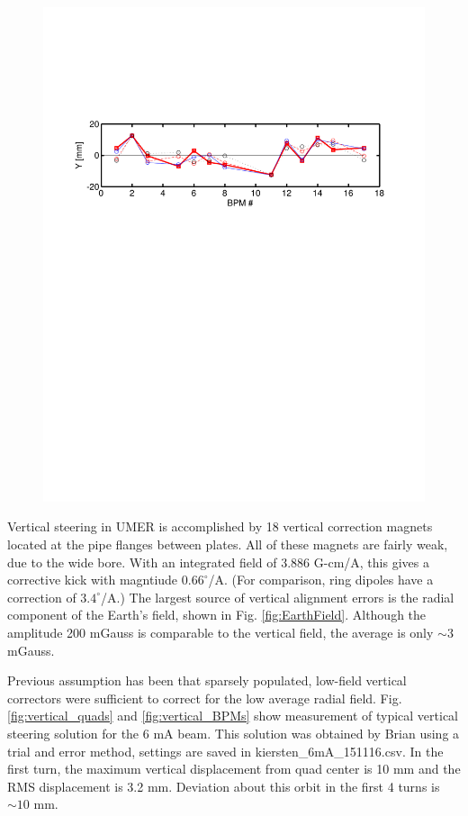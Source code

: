 \begin{figure}[h]
{	\includegraphics[width=\textwidth,trim={.5in 6.5in .5in 2.4in}, clip]{4.figures/BPM_position_sol151116_Y.pdf}}
\end{figure}

Vertical steering in UMER is accomplished by 18 vertical correction magnets located at the pipe flanges between plates. All of these magnets are fairly weak, due to the wide bore. With an integrated field of 3.886 G-cm/A, this gives a corrective kick with magntiude $0.66^{\circ}$/A. (For comparison, ring dipoles have a correction of $3.4^{\circ}$/A.) The largest source of vertical alignment errors is the radial component of the Earth's field, shown in Fig. \ref{fig:EarthField}. Although the amplitude 200 mGauss is comparable to the vertical field, the average is only $\sim3$ mGauss.

Previous assumption has been that sparsely populated, low-field vertical correctors were sufficient to correct for the low average radial field. Fig. \ref{fig:vertical_quads} and \ref{fig:vertical_BPMs} show measurement of typical vertical steering solution for the 6 mA beam. This solution was obtained by Brian using a trial and error method, settings are saved in kiersten\_6mA\_151116.csv. In the first turn, the maximum vertical displacement from quad center is 10 mm and the RMS displacement is 3.2 mm. Deviation about this orbit in the first 4 turns is $\sim10$ mm. 

